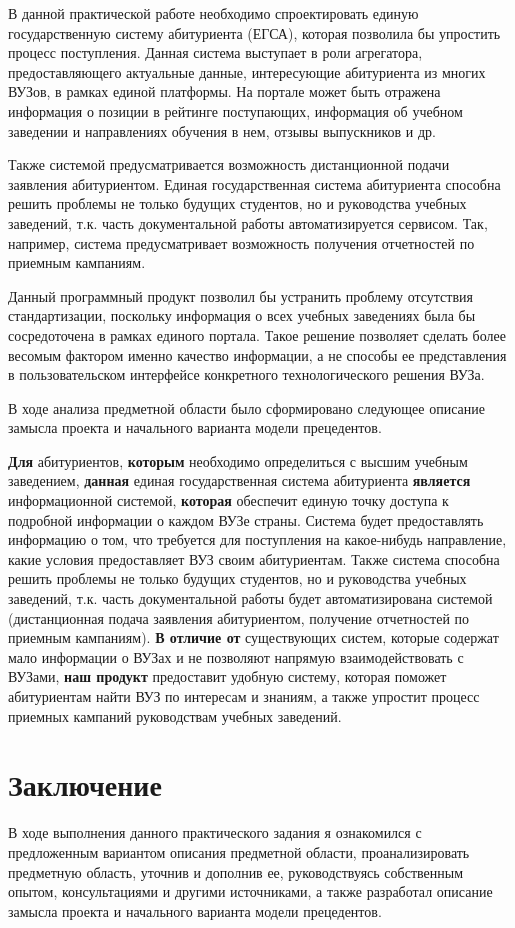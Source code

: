 \documentclass[a4paper, 14pt]{extarticle}
\begin{document}
В данной практической работе необходимо спроектировать единую государственную
систему абитуриента (ЕГСА), которая позволила бы упростить процесс поступления.
Данная система выступает в роли агрегатора, предоставляющего актуальные данные,
интересующие абитуриента из многих ВУЗов, в рамках единой платформы. На портале
может быть отражена информация о позиции в рейтинге поступающих, информация об
учебном заведении и направлениях обучения в нем, отзывы выпускников и др.

Также системой предусматривается возможность дистанционной подачи заявления
абитуриентом. Единая государственная система абитуриента способна решить
проблемы не только будущих студентов, но и руководства учебных заведений, т.к.
часть документальной работы автоматизируется сервисом. Так, например, система
предусматривает возможность получения отчетностей по приемным кампаниям.

Данный программный продукт позволил бы устранить проблему отсутствия
стандартизации, поскольку информация о всех учебных заведениях была бы
сосредоточена в рамках единого портала. Такое решение позволяет сделать более
весомым фактором именно качество информации, а не способы ее представления в
пользовательском интерфейсе конкретного технологического решения ВУЗа.

В ходе анализа предметной области было сформировано следующее описание замысла
проекта и начального варианта модели прецедентов.

\textbf{Для} абитуриентов, \textbf{которым} необходимо определиться с высшим
учебным заведением, \textbf{данная} единая государственная система абитуриента
\textbf{является} информационной системой, \textbf{которая} обеспечит единую
точку доступа к подробной информации о каждом ВУЗе страны. Система будет
предоставлять информацию о том, что требуется для поступления на какое-нибудь
направление, какие условия предоставляет ВУЗ своим абитуриентам. Также система
способна решить проблемы не только будущих студентов, но и руководства учебных
заведений, т.к. часть документальной работы будет автоматизирована системой
(дистанционная подача заявления абитуриентом, получение отчетностей по приемным
кампаниям). \textbf{В отличие от} существующих систем, которые содержат мало
информации о ВУЗах и не позволяют напрямую взаимодействовать с ВУЗами,
\textbf{наш продукт} предоставит удобную систему, которая поможет абитуриентам
найти ВУЗ по интересам и знаниям, а также упростит процесс приемных кампаний
руководствам учебных заведений.

\section{Заключение}

В ходе выполнения данного практического задания я ознакомился с предложенным
вариантом описания предметной области, проанализировать предметную область,
уточнив и дополнив ее, руководствуясь собственным опытом, консультациями и
другими источниками, а также разработал описание замысла проекта и начального
варианта модели прецедентов.
\end{document}

